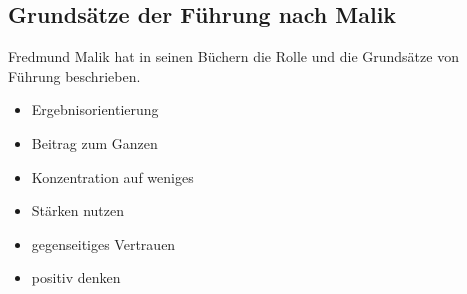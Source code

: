 \subsection{Grundsätze der Führung nach Malik}
\label{fuehrung-grundsätze}


Fredmund Malik \cite{malik-fuehrung} hat in seinen Büchern die Rolle und die Grundsätze von Führung beschrieben.

\begin{itemize}
  \item Ergebnisorientierung
  \item Beitrag zum Ganzen
  \item Konzentration auf weniges
  \item Stärken nutzen
  \item gegenseitiges Vertrauen
  \item positiv denken
\end{itemize}
